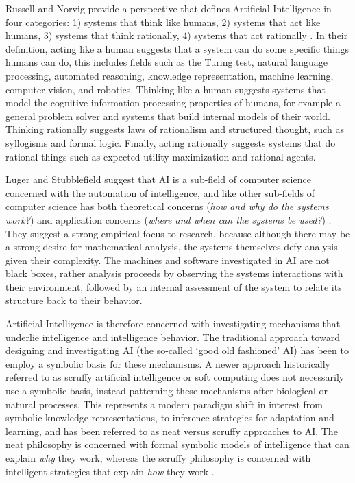 \begin{bibunit}
Russell and Norvig provide a perspective that defines Artificial Intelligence in four categories: 1) systems that think like humans, 2) systems that act like humans, 3) systems that think rationally, 4) systems that act rationally \cite{Russell2009}. In their definition, acting like a human suggests that a system can do some specific things humans can do, this includes fields such as the Turing test, natural language processing, automated reasoning, knowledge representation, machine learning, computer vision, and robotics. Thinking like a human suggests systems that model the cognitive information processing properties of humans, for example a general problem solver and systems that build internal models of their world. Thinking rationally suggests laws of rationalism and structured thought, such as syllogisms and formal logic. Finally, acting rationally suggests systems that do rational things such as expected utility maximization and rational agents. 

Luger and Stubblefield suggest that AI is a sub-field of computer science concerned with the automation of intelligence, and like other sub-fields of computer science has both theoretical concerns (\emph{how and why do the systems work?}) and application concerns (\emph{where and when can the systems be used?}) \cite{Luger1993}. They suggest a strong empirical focus to research, because although there may be a strong desire for mathematical analysis, the systems themselves defy analysis given their complexity. The machines and software investigated in AI are not black boxes, rather analysis proceeds by observing the systems interactions with their environment, followed by an internal assessment of the system to relate its structure back to their behavior.

Artificial Intelligence is therefore concerned with investigating mechanisms that underlie intelligence and intelligence behavior. The traditional approach toward designing and investigating AI (the so-called `good old fashioned' AI) has been to employ a symbolic basis for these mechanisms. A newer approach historically referred to as scruffy artificial intelligence or soft computing does not necessarily use a symbolic basis, instead patterning these mechanisms after biological or natural processes. This represents a modern paradigm shift in interest from symbolic knowledge representations, to inference strategies for adaptation and learning, and has been referred to as neat versus scruffy approaches to AI. The neat philosophy is concerned with formal symbolic models of intelligence that can explain \emph{why} they work, whereas the scruffy philosophy is concerned with intelligent strategies that explain \emph{how} they work \cite{Sloman1990}.


\end{bibunit}
